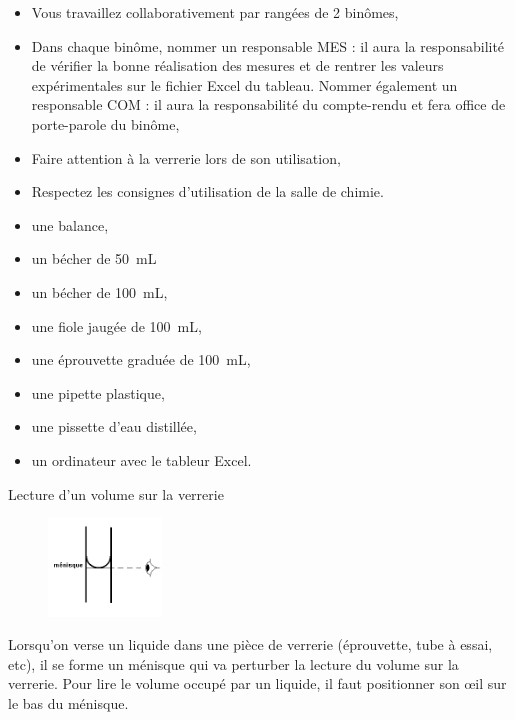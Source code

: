 \begin{tcolorbox}[colback=red!5!white,colframe=red!75!black,title= Consignes :]
\begin{itemize}
    \item Vous travaillez collaborativement par rangées de 2 binômes,
    \item Dans chaque binôme, nommer un responsable \og MES \fg : il aura la responsabilité de vérifier la bonne réalisation des mesures et de rentrer les valeurs expérimentales sur le fichier Excel du tableau. Nommer également un responsable \og COM \fg : il aura la responsabilité du compte-rendu et fera office de porte-parole du binôme,
    \item Faire attention à la verrerie lors de son utilisation,
    \item Respectez les consignes d'utilisation de la salle de chimie.
\end{itemize}

\end{tcolorbox}
\begin{mdframed}[style=autreexo]
\textbf{}
\vspace{-0.5cm}
\begin{multicols}{2}
\begin{itemize}
    \item une balance, 
    \item un bécher de 50~mL
    \item un bécher de 100~mL,
    \item une fiole jaugée de 100~mL,
    \item une éprouvette graduée de 100~mL,
    \item une pipette plastique,
    \item une pissette d'eau distillée,
    \item un ordinateur avec le tableur Excel.    
\end{itemize}
\end{multicols}
\end{mdframed}

\newpage
\begin{doc}{Lecture d'un volume sur la verrerie}

\begin{figure}
\vspace{-2cm}
    \centering
      \includegraphics[width=0.27\textwidth]{Images/Activite/Chap1/Lecture_Verrerie.png}
  \end{figure}
  Lorsqu'on verse un liquide dans une pièce de verrerie (éprouvette, tube à essai, etc), il se forme un ménisque qui va perturber la lecture du volume sur la verrerie. Pour lire le volume occupé par un liquide, il faut positionner son \oe il sur le bas du ménisque.
\end{doc}

